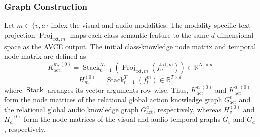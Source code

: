 \documentclass[lettersize,journal]{IEEEtran}
\begin{document}
\subsubsection{Graph Construction}
Let $m\in\{v,a\}$ index the visual and audio modalities. The modality-specific text projection $\operatorname{Proj}_{\mathrm{txt},m}$ maps each class semantic feature to the same $d$-dimensional space as the AVCE output. The initial class-knowledge node matrix and temporal node matrix are defined as
\begin{equation}
K_{\mathrm{act}}^{m,(0)} = \operatorname{Stack}_{n=1}^{N_c}\left(\operatorname{Proj}_{\mathrm{txt},m}\left(f_n^{\mathrm{txt},m}\right)\right)\in\mathbb{R}^{N_c\times d}
\end{equation}
\begin{equation}
H_m^{(0)} = \operatorname{Stack}_{t=1}^{T}\left(f_t^m\right)\in\mathbb{R}^{T\times d}
\end{equation}
where $\operatorname{Stack}$ arranges its vector arguments row-wise. Thus, $K_{\mathrm{act}}^{v,(0)}$ and $K_{\mathrm{act}}^{a,(0)}$ form the node matrices of the relational global action knowledge graph $G_{\mathrm{act}}^v$ and the relational global audio knowledge graph $G_{\mathrm{act}}^a$, respectively, whereas $H_v^{(0)}$ and $H_a^{(0)}$ form the node matrices of the visual and audio temporal graphs $G_v$ and $G_a$, respectively.
\end{document}
